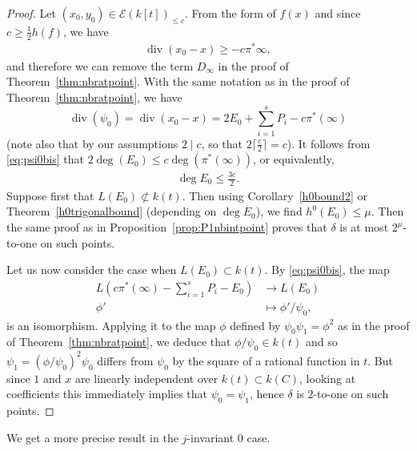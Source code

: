 \documentclass[11pt]{article}
\theoremstyle{plain}
\theoremstyle{definition}
\DeclareMathOperator{\divisor}{div}
\begin{document}
\begin{proof}
Let $(x_0,y_0)\in \mathcal{E}(k[t])_{\leq c}$. From the form of $f(x)$ and since $c\geq \frac{1}{2}h(f)$, we have
\begin{align*}
\divisor(x_0-x)\geq -c\pi^*\infty,
\end{align*}
and therefore we can remove the term $D_\infty$ in the proof of Theorem~\ref{thm:nbratpoint}. With the same notation as in the proof of Theorem~\ref{thm:nbratpoint}, we have
\begin{equation}
\label{eq:psi0bis}
\divisor(\psi_0) = \divisor(x_0-x) = 2E_0+\sum_{i=1}^s P_i -c\pi^*(\infty)
\end{equation}
(note also that by our assumptions $2\mid c$, so that $2\lceil\frac{c}{2}\rceil=c$).
It follows from \eqref{eq:psi0bis} that $2\deg(E_0) \leq c\deg(\pi^*(\infty))$, or equivalently,
\begin{align*}
\deg E_0\leq \frac{3c}{2}.
\end{align*}
Suppose first that $L(E_0)\not\subset k(t)$. Then using Corollary~\ref{h0bound2} or Theorem~\ref{h0trigonalbound} (depending on $\deg E_0$), we find  $h^0(E_0)\leq \mu$. Then the same proof as in Proposition~\ref{prop:P1nbintpoint} proves that $\delta$ is at most $2^\mu$-to-one on such points.

Let us now consider the case when $L(E_0)\subset k(t)$. By \eqref{eq:psi0bis}, the map
\begin{align*}
L(c\pi^*(\infty)-\sum_{i=1}^sP_i-E_0)&\to L(E_0)\\
\phi'&\mapsto \phi'/\psi_0, 
\end{align*}
is an isomorphism. Applying it to the map $\phi$ defined by $\psi_0\psi_1=\phi^2$ as in the proof of Theorem~\ref{thm:nbratpoint}, we deduce that $\phi/\psi_0\in k(t)$ and so $\psi_1=(\phi/\psi_0)^2\psi_0$ differs from $\psi_0$ by the square of a rational function in $t$. But since $1$ and $x$ are linearly independent over $k(t)\subset k(C)$, looking at coefficients this immediately implies that $\psi_0=\psi_1$, hence $\delta$ is $2$-to-one on such points.
\end{proof}


We get a more precise result in the $j$-invariant $0$ case.
\end{document}
